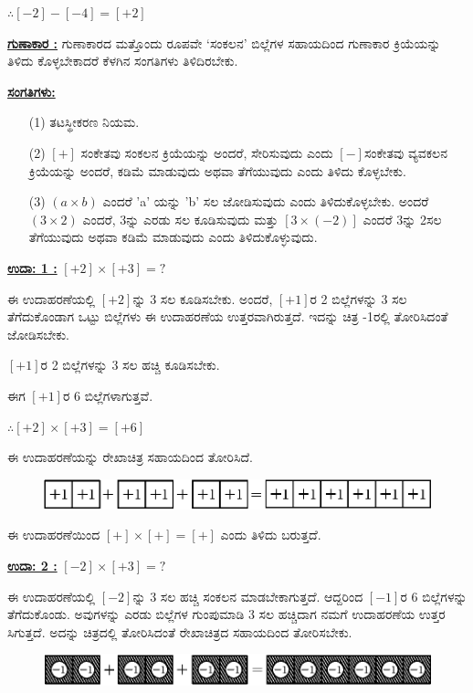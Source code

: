 $\therefore [-2] - [-4] = [+2]$

\noindent
\medskip
{\textbf{\underline{ಗುಣಾಕಾರ :}}} ಗುಣಾಕಾರದ ಮತ್ತೊಂದು ರೂಪವೇ `ಸಂಕಲನ' ಬಿಲ್ಲೆಗಳ ಸಹಾಯದಿಂದ ಗುಣಾಕಾರ ಕ್ರಿಯೆಯನ್ನು ತಿಳಿದು ಕೊಳ್ಳಬೇಕಾದರೆ ಕೆಳಗಿನ ಸಂಗತಿಗಳು ತಿಳಿದಿರಬೇಕು. 

\noindent
{\textbf{\underline{ಸಂಗತಿಗಳು:}}}
\begin{itemize}
\item [(1)] ತಟಸ್ಥೀಕರಣ ನಿಯಮ. 
\item [(2)] $[+]$ ಸಂಕೇತವು ಸಂಕಲನ ಕ್ರಿಯೆಯನ್ನು ಅಂದರೆ, ಸೇರಿಸುವುದು ಎಂದು $[-]$\break ಸಂಕೇತವು ವ್ಯವಕಲನ ಕ್ರಿಯೆಯನ್ನು ಅಂದರೆ, ಕಡಿಮೆ ಮಾಡುವುದು ಅಥವಾ ತೆಗೆಯುವುದು ಎಂದು ತಿಳಿದು ಕೊಳ್ಳಬೇಕು. 
\item[(3)] $(a \times b)$ ಎಂದರೆ 'a' ಯನ್ನು 'b' ಸಲ ಜೋಡಿಸುವುದು ಎಂದು ತಿಳಿದುಕೊಳ್ಳಬೇಕು. ಅಂದರೆ $(3 \times 2)$ ಎಂದರೆ, 3ನ್ನು ಎರಡು ಸಲ ಕೂಡಿಸುವುದು ಮತ್ತು $[3 \times (-2)]$ ಎಂದರೆ 3ನ್ನು 2ಸಲ ತೆಗೆಯುವುದು ಅಥವಾ ಕಡಿಮೆ ಮಾಡುವುದು ಎಂದು ತಿಳಿದುಕೊಳ್ಳುವುದು.
\end{itemize}

\noindent
{\textbf{\underline{ಉದಾ: 1 :}}} $[+2] \times [+3] = ?$

ಈ ಉದಾಹರಣೆಯಲ್ಲಿ $[+2]$ನ್ನು 3 ಸಲ ಕೂಡಿಸಬೇಕು. ಅಂದರೆ, $[+1]$ರ 2 ಬಿಲ್ಲೆಗಳನ್ನು 3 ಸಲ ತೆಗೆದುಕೊಂಡಾಗ ಒಟ್ಟು ಬಿಲ್ಲೆಗಳು ಈ ಉದಾಹರಣೆಯ ಉತ್ತರವಾಗಿರುತ್ತದೆ. ಇದನ್ನು ಚಿತ್ರ -1ರಲ್ಲಿ ತೋರಿಸಿದಂತೆ ಜೋಡಿಸಬೇಕು. 

$[+1]$ರ 2 ಬಿಲ್ಲೆಗಳನ್ನು 3 ಸಲ ಹಚ್ಚಿ ಕೂಡಿಸಬೇಕು.

ಈಗ $[+1]$ರ 6 ಬಿಲ್ಲೆಗಳಾಗುತ್ತವೆ.

$\therefore [+2] \times [+3] = [+6]$

ಈ ಉದಾಹರಣೆಯನ್ನು ರೇಖಾಚಿತ್ರ ಸಹಾಯದಿಂದ ತೋರಿಸಿದೆ. 
\begin{figure}[H]
\centering
\includegraphics[scale=0.8]{src/figure/chap3/fig3-18b.eps}
\end{figure} 

ಈ ಉದಾಹರಣೆಯಿಂದ $[+] \times [+] = [+]$ ಎಂದು ತಿಳಿದು ಬರುತ್ತದೆ.

\noindent
{\textbf{\underline{ಉದಾ: 2 :}}} $[-2] \times [+3] = ?$

ಈ ಉದಾಹರಣೆಯಲ್ಲಿ $[-2]$ನ್ನು 3 ಸಲ ಹಚ್ಚಿ ಸಂಕಲನ ಮಾಡಬೇಕಾಗುತ್ತದೆ. ಆದ್ದರಿಂದ $[-1]$ರ 6 ಬಿಲ್ಲೆಗಳನ್ನು ತೆಗೆದುಕೊಂಡು. ಅವುಗಳನ್ನು ಎರಡು ಬಿಲ್ಲೆಗಳ ಗುಂಪುಮಾಡಿ 3 ಸಲ ಹಚ್ಚಿದಾಗ ನಮಗೆ ಉದಾಹರಣೆಯ ಉತ್ತರ ಸಿಗುತ್ತದೆ. ಅದನ್ನು ಚಿತ್ರದಲ್ಲಿ ತೋರಿಸಿದಂತೆ  ರೇಖಾಚಿತ್ರದ ಸಹಾಯದಿಂದ ತೋರಿಸಬೇಕು.
\begin{figure}[H]
\centering
\includegraphics[scale=0.8]{src/figure/chap3/fig3-19.eps}\\
\end{figure}

